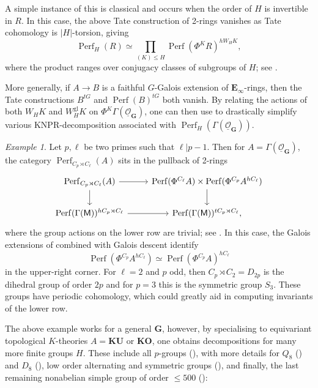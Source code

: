 \documentclass[11pt, a4paper]{article}
\newcommand{\gl}{\mathrm{gl}}
\newcommand{\1}{\mathbf{1}}
\newcommand{\gKU}{{\mathbf{KU}}}
\newcommand{\gKO}{{\mathbf{KO}}}
\DeclareMathOperator{\Perf}{Perf}
\newcommand{\ul}[1]{\underline{#1}}
\newcommand{\E}{\mathbf{E}}
\newcommand{\G}{\mathbf{G}}
\newcommand{\M}{\mathsf{M}}
\renewcommand{\O}{\mathcal{O}}
\newcommand{\Ga}{\Gamma}
\theoremstyle{plain}
\theoremstyle{definition}
\theoremstyle{remark}\numberwithin{equation}{section}
\newtheorem{example}[equation]{Example}
\begin{document}
A simple instance of this is classical and occurs when the order of $H$ is invertible in $R$. In this case, the above Tate construction of 2-rings vanishes as Tate cohomology is $|H|$-torsion, giving
\[\Perf_H(R) {\simeq} \prod_{(K)\leq H} \Perf(\Phi^K R)^{hW_H K},\]
where the product ranges over conjugacy classes of subgroups of $H$; see .

More generally, if $A \to B$ is a faithful $G$-Galois extension of $\E_\infty$-rings, then the Tate constructions $B^{tG}$ and $\Perf(B)^{tG}$ both vanish. By relating the actions of both $W_H K$ and $W_H^\gl K$ on $\Phi^K \Ga(\ul{\O}_\G)$, one can then use  to drastically simplify various KNPR-decomposition associated with $\Perf_H(\Ga(\ul{\O}_\G))$.

\begin{example}\label{ex:intro_p_ell}
    Let $p,\ell$ be two primes such that $\ell | p-1$. Then for $A=\Ga(\ul{\O}_\G)$, the category $\Perf_{C_p\rtimes C_\ell}(A)$ sits in the pullback of 2-rings
\[\begin{tikzcd}
    {\Perf_{C_p\rtimes C_\ell}(A)}\ar[r]\ar[d]    &   {\Perf(\Phi^{C_\ell}A) \times \Perf(\Phi^{C_p}A^{hC_\ell})}\ar[d]  \\
    {\Perf(\Ga(\M))^{hC_p\rtimes C_\ell}}\ar[r] &   {\Perf(\Ga(\M))^{tC_p\rtimes C_\ell},}
\end{tikzcd}\]
    where the group actions on the lower row are trivial; see . In this case, the Galois extensions of  combined with Galois descent identify
    \[\Perf(\Phi^{C_p} A^{hC_\ell}) \simeq \Perf(\Phi^{C_p} A)^{hC_\ell}\]
    in the upper-right corner. For $\ell=2$ and $p$ odd, then $C_p\rtimes C_2=D_{2p}$ is the dihedral group of order $2p$ and for $p=3$ this is the symmetric group $S_3$. These groups have periodic cohomology, which could greatly aid in computing invariants of the lower row.
\end{example}

The above example works for a general $\G$, however, by specialising to equivariant topological $K$-theories $A=\gKU$ or $\gKO$, one obtains decompositions for many more finite groups $H$. These include all $p$-groups (), with more details for $Q_8$ () and $D_8$ (), low order alternating and symmetric groups (), and finally, the last remaining nonabelian simple group of order $\leq 500$ ():
\end{document}
